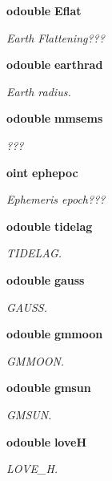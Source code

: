 \begin{CompactItemize}
{\bf odouble} {\bf Eflat}
\begin{CompactList}\small\item\em Earth Flattening??? \item\end{CompactList}\item 
{\bf odouble} {\bf earthrad}
\begin{CompactList}\small\item\em Earth radius. \item\end{CompactList}\item 
{\bf odouble} {\bf mmsems}
\begin{CompactList}\small\item\em ??? \item\end{CompactList}\item 
{\bf oint} {\bf ephepoc}
\begin{CompactList}\small\item\em Ephemeris epoch??? \item\end{CompactList}\item 
{\bf odouble} {\bf tidelag}
\begin{CompactList}\small\item\em TIDELAG. \item\end{CompactList}\item 
{\bf odouble} {\bf gauss}
\begin{CompactList}\small\item\em GAUSS. \item\end{CompactList}\item 
{\bf odouble} {\bf gmmoon}
\begin{CompactList}\small\item\em GMMOON. \item\end{CompactList}\item 
{\bf odouble} {\bf gmsun}
\begin{CompactList}\small\item\em GMSUN. \item\end{CompactList}\item 
{\bf odouble} {\bf love\-H}
\begin{CompactList}\small\item\em LOVE\_\-H. \item\end{CompactList}\item 

\end{CompactItemize}
